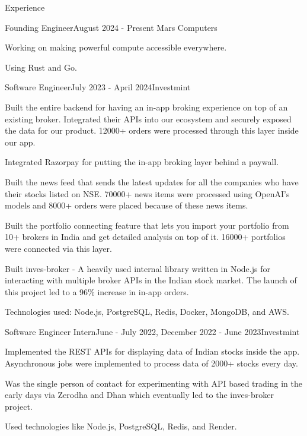 \documentclass{resume} %
\begin{document}
\begin{rSection}{Experience}
\begin{rSubsection}{Founding Engineer}{August 2024 - Present}
{Mars Computers}{}
\item Working on making powerful compute accessible everywhere.
\item Using Rust and Go.

\end{rSubsection}
\begin{rSubsection}{Software Engineer}{July 2023 - April 2024}{Investmint}{}
\item Built the entire backend for having an in-app broking experience on top of an existing broker. Integrated their APIs into our ecosystem and securely exposed the data for our product. 12000+ orders were processed through this layer inside our app.
\item Integrated Razorpay for putting the in-app broking layer behind a paywall.
\item Built the news feed that sends the latest updates for all the companies who have their stocks listed on NSE. 70000+ news items were processed using OpenAI’s models and 8000+ orders were placed because of these news items.
\item Built the portfolio connecting feature that lets you import your portfolio from 10+ brokers in India and get detailed analysis on top of it. 16000+ portfolios were connected via this layer.
\item Built inves-broker - A heavily used internal library written in Node.js for interacting with multiple broker APIs in the Indian stock market. The launch of this project led to a 96\% increase in in-app orders.
\item Technologies used: Node.js, PostgreSQL, Redis, Docker, MongoDB, and AWS.
\end{rSubsection}
\begin{rSubsection}{Software Engineer Intern}{June - July 2022, December 2022 - June 2023}{Investmint}{}
\item Implemented the REST APIs for displaying data of Indian stocks inside the app. Asynchronous jobs were implemented to process data of 2000+ stocks every day.
\item Was the single person of contact for experimenting with API based trading in the early days via Zerodha and Dhan which eventually led to the inves-broker project.
\item Used technologies like Node.js, PostgreSQL, Redis, and Render.
\end{rSubsection}
\end{rSection}
\end{document}
